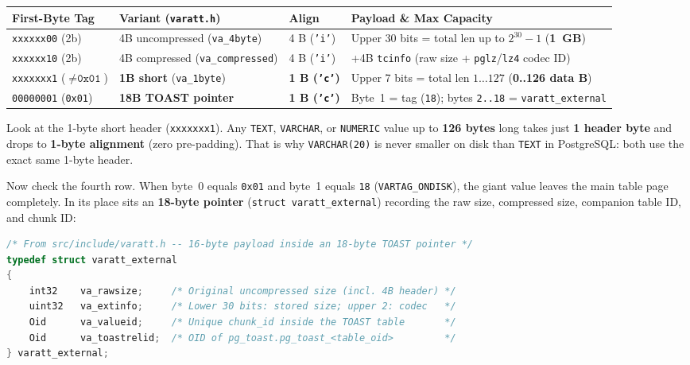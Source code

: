 \begin{center}
\small
\begin{tabular}{@{}lllp{5.8cm}@{}}
\toprule
\textbf{First-Byte Tag} & \textbf{Variant (\texttt{varatt.h})} & \textbf{Align} & \textbf{Payload \& Max Capacity} \\
\midrule
\texttt{xxxxxx00} (2b) & 4B uncompressed (\texttt{va\_4byte}) & 4 B (\texttt{'i'}) & Upper 30 bits = total len up to $2^{30}-1$ (\textbf{1~GB}) \\
\texttt{xxxxxx10} (2b) & 4B compressed (\texttt{va\_compressed}) & 4 B (\texttt{'i'}) & +4B \texttt{tcinfo} (raw size + \texttt{pglz}/\texttt{lz4} codec ID) \\
\texttt{xxxxxxx1} ($\neq \texttt{0x01}$) & \textbf{1B short} (\texttt{va\_1byte}) & \textbf{1 B (\texttt{'c'})} & Upper 7 bits = total len $1\dots 127$ (\textbf{0..126 data B}) \\
\texttt{00000001} (\texttt{0x01}) & \textbf{18B TOAST pointer} & \textbf{1 B (\texttt{'c'})} & Byte~1 = tag (\texttt{18}); bytes \texttt{2..18} = \texttt{varatt\_external} \\
\bottomrule
\end{tabular}
\end{center}

Look at the 1-byte short header (\texttt{xxxxxxx1}). Any \texttt{TEXT}, \texttt{VARCHAR}, or \texttt{NUMERIC} value up to \textbf{126 bytes} long takes just \textbf{1 header byte} and drops to \textbf{1-byte alignment} (zero pre-padding). That is why \texttt{VARCHAR(20)} is never smaller on disk than \texttt{TEXT} in PostgreSQL: both use the exact same 1-byte header.

Now check the fourth row. When byte~0 equals \texttt{0x01} and byte~1 equals \texttt{18} (\texttt{VARTAG\_ONDISK}), the giant value leaves the main table page completely. In its place sits an \textbf{18-byte pointer} (\texttt{struct varatt\_external}) recording the raw size, compressed size, companion table ID, and chunk ID:

\begin{lstlisting}[language=C]
/* From src/include/varatt.h -- 16-byte payload inside an 18-byte TOAST pointer */
typedef struct varatt_external
{
    int32    va_rawsize;     /* Original uncompressed size (incl. 4B header) */
    uint32   va_extinfo;     /* Lower 30 bits: stored size; upper 2: codec   */
    Oid      va_valueid;     /* Unique chunk_id inside the TOAST table       */
    Oid      va_toastrelid;  /* OID of pg_toast.pg_toast_<table_oid>         */
} varatt_external;
\end{lstlisting}


